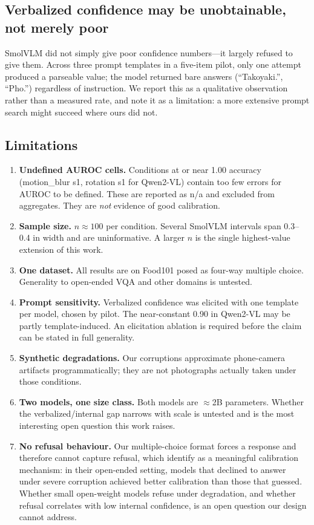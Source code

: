 \documentclass[11pt]{article}
\begin{document}
\subsection{Verbalized confidence may be unobtainable, not merely poor}
\label{sec:unobtainable}

SmolVLM did not simply give poor confidence numbers---it largely refused to give
them. Across three prompt templates in a five-item pilot, only one attempt
produced a parseable value; the model returned bare answers (``Takoyaki.'',
``Pho.'') regardless of instruction. We report this as a qualitative observation
rather than a measured rate, and note it as a limitation: a more extensive
prompt search might succeed where ours did not.

\subsection{Limitations}

\begin{enumerate}
\item \textbf{Undefined AUROC cells.} Conditions at or near 1.00 accuracy
(motion\_blur s1, rotation s1 for Qwen2-VL) contain too few errors for AUROC to
be defined. These are reported as n/a and excluded from aggregates. They are
\emph{not} evidence of good calibration.
\item \textbf{Sample size.} $n \approx 100$ per condition. Several SmolVLM
intervals span 0.3--0.4 in width and are uninformative. A larger $n$ is the
single highest-value extension of this work.
\item \textbf{One dataset.} All results are on Food101 posed as four-way
multiple choice. Generality to open-ended VQA and other domains is untested.
\item \textbf{Prompt sensitivity.} Verbalized confidence was elicited with one
template per model, chosen by pilot. The near-constant 0.90 in Qwen2-VL may be
partly template-induced. An elicitation ablation is required before the claim
can be stated in full generality.
\item \textbf{Synthetic degradations.} Our corruptions approximate phone-camera
artifacts programmatically; they are not photographs actually taken under those
conditions.
\item \textbf{Two models, one size class.} Both models are $\approx$2B
parameters. Whether the verbalized/internal gap narrows with scale is untested
and is the most interesting open question this work raises.
\item \textbf{No refusal behaviour.} Our multiple-choice format forces a
response and therefore cannot capture refusal, which \citet{borszukovszki2025}
identify as a meaningful calibration mechanism: in their open-ended setting,
models that declined to answer under severe corruption achieved better
calibration than those that guessed. Whether small open-weight models refuse
under degradation, and whether refusal correlates with low internal confidence,
is an open question our design cannot address.
\end{enumerate}
\end{document}
